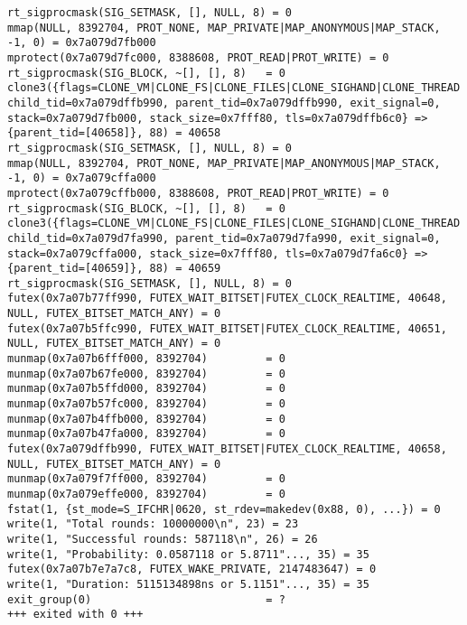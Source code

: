\begin{verbatim}
rt_sigprocmask(SIG_SETMASK, [], NULL, 8) = 0
mmap(NULL, 8392704, PROT_NONE, MAP_PRIVATE|MAP_ANONYMOUS|MAP_STACK, -1, 0) = 0x7a079d7fb000
mprotect(0x7a079d7fc000, 8388608, PROT_READ|PROT_WRITE) = 0
rt_sigprocmask(SIG_BLOCK, ~[], [], 8)   = 0
clone3({flags=CLONE_VM|CLONE_FS|CLONE_FILES|CLONE_SIGHAND|CLONE_THREAD|CLONE_SYSVSEM|CLONE_SETTLS|CLONE_PARENT_SETTID|CLONE_CHILD_CLEARTID, child_tid=0x7a079dffb990, parent_tid=0x7a079dffb990, exit_signal=0, stack=0x7a079d7fb000, stack_size=0x7fff80, tls=0x7a079dffb6c0} => {parent_tid=[40658]}, 88) = 40658
rt_sigprocmask(SIG_SETMASK, [], NULL, 8) = 0
mmap(NULL, 8392704, PROT_NONE, MAP_PRIVATE|MAP_ANONYMOUS|MAP_STACK, -1, 0) = 0x7a079cffa000
mprotect(0x7a079cffb000, 8388608, PROT_READ|PROT_WRITE) = 0
rt_sigprocmask(SIG_BLOCK, ~[], [], 8)   = 0
clone3({flags=CLONE_VM|CLONE_FS|CLONE_FILES|CLONE_SIGHAND|CLONE_THREAD|CLONE_SYSVSEM|CLONE_SETTLS|CLONE_PARENT_SETTID|CLONE_CHILD_CLEARTID, child_tid=0x7a079d7fa990, parent_tid=0x7a079d7fa990, exit_signal=0, stack=0x7a079cffa000, stack_size=0x7fff80, tls=0x7a079d7fa6c0} => {parent_tid=[40659]}, 88) = 40659
rt_sigprocmask(SIG_SETMASK, [], NULL, 8) = 0
futex(0x7a07b77ff990, FUTEX_WAIT_BITSET|FUTEX_CLOCK_REALTIME, 40648, NULL, FUTEX_BITSET_MATCH_ANY) = 0
futex(0x7a07b5ffc990, FUTEX_WAIT_BITSET|FUTEX_CLOCK_REALTIME, 40651, NULL, FUTEX_BITSET_MATCH_ANY) = 0
munmap(0x7a07b6fff000, 8392704)         = 0
munmap(0x7a07b67fe000, 8392704)         = 0
munmap(0x7a07b5ffd000, 8392704)         = 0
munmap(0x7a07b57fc000, 8392704)         = 0
munmap(0x7a07b4ffb000, 8392704)         = 0
munmap(0x7a07b47fa000, 8392704)         = 0
futex(0x7a079dffb990, FUTEX_WAIT_BITSET|FUTEX_CLOCK_REALTIME, 40658, NULL, FUTEX_BITSET_MATCH_ANY) = 0
munmap(0x7a079f7ff000, 8392704)         = 0
munmap(0x7a079effe000, 8392704)         = 0
fstat(1, {st_mode=S_IFCHR|0620, st_rdev=makedev(0x88, 0), ...}) = 0
write(1, "Total rounds: 10000000\n", 23) = 23
write(1, "Successful rounds: 587118\n", 26) = 26
write(1, "Probability: 0.0587118 or 5.8711"..., 35) = 35
futex(0x7a07b7e7a7c8, FUTEX_WAKE_PRIVATE, 2147483647) = 0
write(1, "Duration: 5115134898ns or 5.1151"..., 35) = 35
exit_group(0)                           = ?
+++ exited with 0 +++

\end{verbatim}